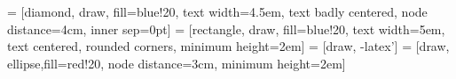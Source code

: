 \usepackage{multirow}
\usepackage{tikz}
\usetikzlibrary{shapes,arrows}

 = [diamond, draw, fill=blue!20, 
    text width=4.5em, text badly centered, node distance=4cm, inner sep=0pt]
 = [rectangle, draw, fill=blue!20, 
    text width=5em, text centered, rounded corners, minimum height=2em]
 = [draw, -latex']
 = [draw, ellipse,fill=red!20, node distance=3cm,
    minimum height=2em]


    

